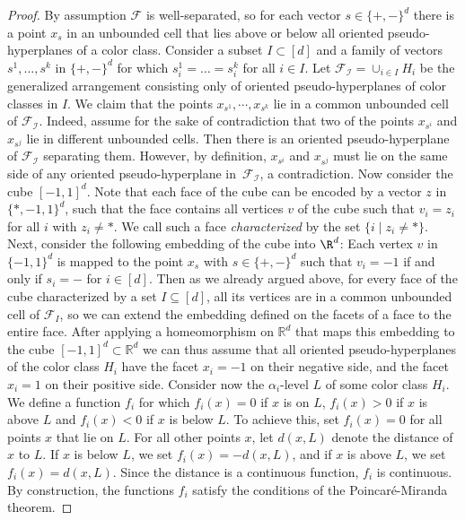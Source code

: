 \begin{proof}
By assumption $\mathcal{F}$ is well-separated, so for each vector $s \in \{+, -\}^d$ there is a point $x_s$ in an unbounded cell that lies above or below all oriented pseudo-hyperplanes of a color class. Consider a subset $I\subset [d]$ and a family of vectors $s^1,\ldots,s^k$ in $\{+, -\}^d$ for which $s_i^1=\ldots =s_i^k$ for all $i\in I$. Let $\mathcal{F_{I}}=\cup_{i\in I} H_i$ be the generalized arrangement consisting only of oriented pseudo-hyperplanes of color classes in $I$. We claim that the points $x_{s^1},\cdots,x_{s^k}$ lie in a common unbounded cell of $\mathcal{F_{I}}$. Indeed, assume for the sake of contradiction that two of the points $x_{s^i}$ and $x_{s^j}$ lie in different unbounded cells. Then there is an oriented pseudo-hyperplane of $\mathcal{F_{I}}$ separating them. However, by definition, $x_{s^i}$ and $x_{s^j}$ must lie on the same side of any oriented pseudo-hyperplane in~$\mathcal{F_{I}}$, a contradiction.
%
%
Now consider the cube $[-1,1]^d$.
Note that each face of the cube can be encoded by a vector $z$ in $\{*,-1,1\}^d$, such that the face contains all vertices $v$ of the cube such that $v_i = z_i$ for all $i$ with $z_i \neq *$.
We call such a face \emph{characterized} by the set $\{i \mid z_i \neq *\}$. 
%
Next, consider the following embedding of the cube into $\R^d$: Each vertex $v$ in $\{-1,1\}^d$ is mapped to the point $x_s$ with $s \in \{+,-\}^d$ such that $v_i = -1$ if and only if $s_i = -$ for $i \in [d]$.
Then as we already argued above, for every face of the cube characterized by a set $I \subseteq [d]$, all its vertices are in a common unbounded cell of $\mathcal{F}_I$, so we can extend the embedding defined on the facets of a face to the entire face.
%
After applying a homeomorphism on $\mathbb{R}^d$ that maps this embedding to the cube $[-1,1]^d\subset\mathbb{R}^d$ we can thus assume that all oriented pseudo-hyperplanes of the color class $H_i$ have the facet $x_i=-1$ on their negative side, and the facet $x_i=1$ on their positive side.
%
Consider now the $\alpha_i$-level $L$ of some color class $H_i$. We define a function $f_i$ for which $f_i(x)=0$ if $x$ is on $L$, $f_i(x)>0$ if $x$ is above $L$ and $f_i(x)<0$ if $x$ is below $L$. To achieve this, set $f_i(x) = 0$ for all points $x$ that lie on $L$. For all other points $x$, let $d(x, L)$ denote the distance of $x$ to $L$. If $x$ is below $L$, we set $f_i(x) = -d(x, L)$, and if $x$ is above $L$, we set $f_i(x) = d(x, L)$. Since the distance is a continuous function, $f_i$ is continuous. 
%
By construction, the functions $f_i$ satisfy the conditions of the Poincar\'{e}-Miranda theorem.

\end{proof}
